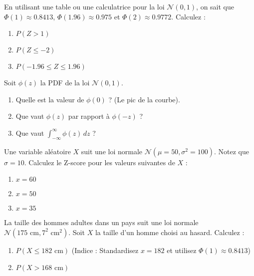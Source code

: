 \begin{exercicebox}
En utilisant une table ou une calculatrice pour la loi $\mathcal{N}(0, 1)$, on sait que $\Phi(1) \approx 0.8413$, $\Phi(1.96) \approx 0.975$ et $\Phi(2) \approx 0.9772$.
Calculez :
\begin{enumerate}
    \item $P(Z > 1)$
    \item $P(Z \le -2)$
    \item $P(-1.96 \le Z \le 1.96)$
\end{enumerate}
\end{exercicebox}

\begin{exercicebox}
Soit $\phi(z)$ la PDF de la loi $\mathcal{N}(0, 1)$.
\begin{enumerate}
    \item Quelle est la valeur de $\phi(0)$ ? (Le pic de la courbe).
    \item Que vaut $\phi(z)$ par rapport à $\phi(-z)$ ?
    \item Que vaut $\int_{-\infty}^{\infty} \phi(z) \, dz$ ?
\end{enumerate}
\end{exercicebox}


\begin{exercicebox}
Une variable aléatoire $X$ suit une loi normale $\mathcal{N}(\mu=50, \sigma^2=100)$. Notez que $\sigma=10$.
Calculez le Z-score pour les valeurs suivantes de $X$ :
\begin{enumerate}
    \item $x = 60$
    \item $x = 50$
    \item $x = 35$
\end{enumerate}
\end{exercicebox}

\begin{exercicebox}
La taille des hommes adultes dans un pays suit une loi normale $\mathcal{N}(175 \text{ cm}, 7^2 \text{ cm}^2)$.
Soit $X$ la taille d'un homme choisi au hasard. Calculez :
\begin{enumerate}
    \item $P(X \le 182 \text{ cm})$ (Indice : Standardisez $x=182$ et utilisez $\Phi(1) \approx 0.8413$)
    \item $P(X > 168 \text{ cm})$
\end{enumerate}
\end{exercicebox}

